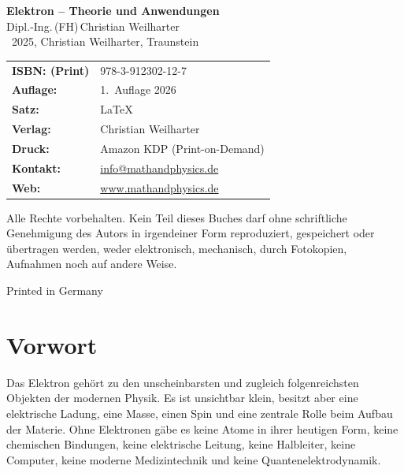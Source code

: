 \cleardoublepage
\thispagestyle{empty}
\begin{center}


{\Large\textbf{Elektron – Theorie und Anwendungen}}\\[1.2em]
{\large Dipl.-Ing.\,(FH)\,Christian Weilharter}\\[1.2em]
\textcopyright~2025, Christian Weilharter, Traunstein\\[2em]
\end{center}
\begin{flushleft}
	\begin{tabular}{@{}l l}
	
	
		\textbf{ISBN: (Print)} & 978-3-912302-12-7 \\[0.5em]
		\textbf{Auflage:} & 1.~Auflage 2026 \\[0.5em]
		\textbf{Satz:} & \LaTeX \\[0.5em]
		\textbf{Verlag:} & Christian Weilharter \\[0.5em]
		\textbf{Druck:} & Amazon KDP (Print-on-Demand) \\[0.5em]

		
		\textbf{Kontakt:} & \href{mailto:info@mathandphysics.de}{info@mathandphysics.de}\\[0.5em]
		\textbf{Web:} & \href{https://www.mathandphysics.de}{www.mathandphysics.de}\\
		

	\end{tabular}
\end{flushleft}

\vspace{2em}
\noindent
Alle Rechte vorbehalten. Kein Teil dieses Buches darf ohne schriftliche Genehmigung des Autors 
in irgendeiner Form reproduziert, gespeichert oder übertragen werden, 
weder elektronisch, mechanisch, durch Fotokopien, Aufnahmen noch auf andere Weise.
\begin{center}\small Printed in Germany\end{center}

\cleardoublepage
\chapter*{Vorwort}

Das Elektron gehört zu den unscheinbarsten und zugleich folgenreichsten Objekten der modernen Physik. 
Es ist unsichtbar klein, besitzt aber eine elektrische Ladung, eine Masse, einen Spin und eine zentrale Rolle beim Aufbau der Materie. 
Ohne Elektronen gäbe es keine Atome in ihrer heutigen Form, keine chemischen Bindungen, keine elektrische Leitung, keine Halbleiter, keine Computer, keine moderne Medizintechnik und keine Quantenelektrodynamik.

